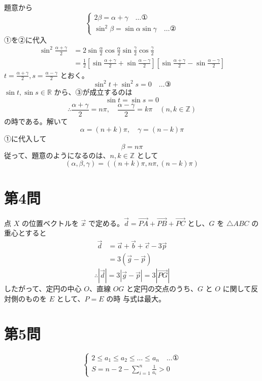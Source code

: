 \documentclass[../main.tex]{subfiles}
\begin{document}
\noindent
[\textbf{解}] 題意から
\[
  \begin{cases}
    2\beta = \alpha + \gamma \quad \dots \text{①} \\
    \sin^2\beta = \sin\alpha \sin\gamma \quad \dots \text{②}
  \end{cases}
\]
①を②に代入
\begin{align*}
  \sin^2 \frac{\alpha+\gamma}{2} &= 2\sin\frac{\alpha}{2}\cos\frac{\alpha}{2} \sin\frac{\gamma}{2}\cos\frac{\gamma}{2} \\
  &= \frac{1}{2} \left[ \sin\frac{\alpha+\gamma}{2} + \sin\frac{\alpha-\gamma}{2} \right] \left[ \sin\frac{\alpha+\gamma}{2} - \sin\frac{\alpha-\gamma}{2} \right]
\end{align*}
$t = \frac{\alpha+\gamma}{2}, s = \frac{\alpha-\gamma}{2}$ とおく。
\[
  \sin^2 t + \sin^2 s = 0 \quad \dots \text{③}
\]
$\sin t, \sin s \in \mathbb{R}$ から、③が成立するのは
\[
  \sin t = \sin s = 0
\]
\[
  \therefore \frac{\alpha+\gamma}{2} = n\pi, \quad \frac{\alpha-\gamma}{2} = k\pi \quad (n, k \in \mathbb{Z})
\]
の時である。解いて
\[
  \alpha = (n+k)\pi, \quad \gamma = (n-k)\pi
\]
①に代入して
\[
  \beta = n\pi
\]
従って、題意のようになるのは、$n, k \in \mathbb{Z}$ として
\[
  (\alpha, \beta, \gamma) = ((n+k)\pi, n\pi, (n-k)\pi)
\]

\newpage

\section*{第4問}

\noindent
[\textbf{解}] 点 $X$ の位置ベクトルを $\vec{x}$ で定める。$\vec{d} = \vec{PA} + \vec{PB} + \vec{PC}$ とし、$G$ を $\triangle ABC$ の重心とすると
\begin{align*}
  \vec{d} &= \vec{a} + \vec{b} + \vec{c} - 3\vec{p} \\
  &= 3(\vec{g} - \vec{p})
\end{align*}
\[
  \therefore |\vec{d}| = 3|\vec{g} - \vec{p}| = 3|\vec{PG}|
\]
したがって、定円の中心 $O$、直線 $OG$ と定円の交点のうち、$G$ と $O$ に関して反対側のものを $E$ として、$P = E$ の時 与式は最大。

\newpage

\section*{第5問}

\noindent
[\textbf{解}]
\[
  \begin{cases}
    2 \le a_1 \le a_2 \le \dots \le a_n \quad \dots \text{①} \\
    S = n-2 - \displaystyle\sum_{i=1}^n \frac{1}{a_i} > 0
  \end{cases}
\]
\end{document}
